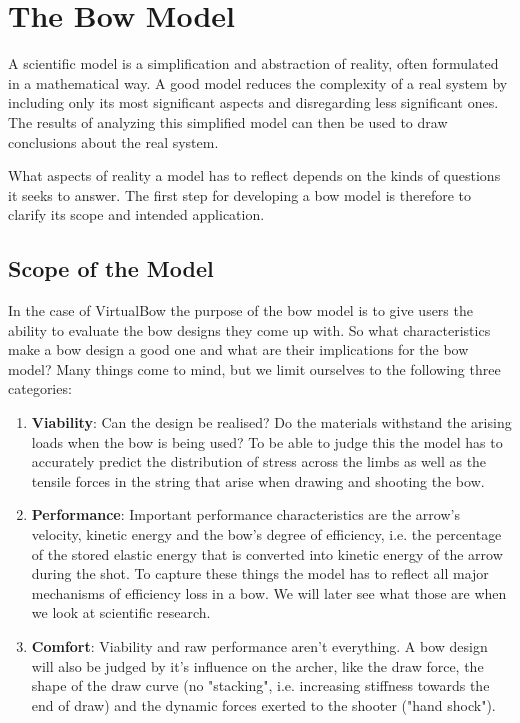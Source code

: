 \chapter{The Bow Model}

A scientific model is a simplification and abstraction of reality, often formulated in a mathematical way.
A good model reduces the complexity of a real system by including only its most significant aspects and disregarding less significant ones.
The results of analyzing this simplified model can then be used to draw conclusions about the real system.

What aspects of reality a model has to reflect depends on the kinds of questions it seeks to answer.
The first step for developing a bow model is therefore to clarify its scope and intended application.

\section{Scope of the Model}
\label{section:model-scope}

In the case of VirtualBow the purpose of the bow model is to give users the ability to evaluate the bow designs they come up with.
So what characteristics make a bow design a good one and what are their implications for the bow model?
Many things come to mind, but we limit ourselves to the following three categories:

\begin{enumerate}
\item \textbf{Viability}: Can the design be realised? Do the materials withstand the arising loads when the bow is being used?
To be able to judge this the model has to accurately predict the distribution of stress across the limbs as well as the tensile forces in the string that arise when drawing and shooting the bow.

\item \textbf{Performance}: Important performance characteristics are the arrow's velocity, kinetic energy and the bow's degree of efficiency, i.e. the percentage of the stored elastic energy that is converted into kinetic energy of the arrow during the shot.
To capture these things the model has to reflect all major mechanisms of efficiency loss in a bow.
We will later see what those are when we look at scientific research.

\item \textbf{Comfort}: Viability and raw performance aren't everything.
A bow design will also be judged by it's influence on the archer, like the draw force, the shape of the draw curve (no "stacking", i.e. increasing stiffness towards the end of draw) and the dynamic forces exerted to the shooter ("hand shock").
\end{enumerate}

